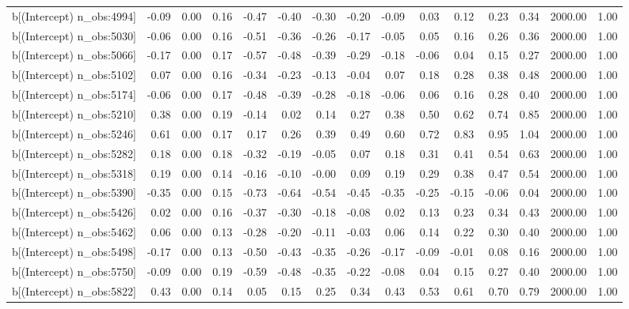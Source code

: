 \begin{table}[ht]
\begin{tabular}{rrrrrrrrrrrrrrr}
  b[(Intercept) n\_obs:4994] & -0.09 & 0.00 & 0.16 & -0.47 & -0.40 & -0.30 & -0.20 & -0.09 & 0.03 & 0.12 & 0.23 & 0.34 & 2000.00 & 1.00 \\ 
  b[(Intercept) n\_obs:5030] & -0.06 & 0.00 & 0.16 & -0.51 & -0.36 & -0.26 & -0.17 & -0.05 & 0.05 & 0.16 & 0.26 & 0.36 & 2000.00 & 1.00 \\ 
  b[(Intercept) n\_obs:5066] & -0.17 & 0.00 & 0.17 & -0.57 & -0.48 & -0.39 & -0.29 & -0.18 & -0.06 & 0.04 & 0.15 & 0.27 & 2000.00 & 1.00 \\ 
  b[(Intercept) n\_obs:5102] & 0.07 & 0.00 & 0.16 & -0.34 & -0.23 & -0.13 & -0.04 & 0.07 & 0.18 & 0.28 & 0.38 & 0.48 & 2000.00 & 1.00 \\ 
  b[(Intercept) n\_obs:5174] & -0.06 & 0.00 & 0.17 & -0.48 & -0.39 & -0.28 & -0.18 & -0.06 & 0.06 & 0.16 & 0.28 & 0.40 & 2000.00 & 1.00 \\ 
  b[(Intercept) n\_obs:5210] & 0.38 & 0.00 & 0.19 & -0.14 & 0.02 & 0.14 & 0.27 & 0.38 & 0.50 & 0.62 & 0.74 & 0.85 & 2000.00 & 1.00 \\ 
  b[(Intercept) n\_obs:5246] & 0.61 & 0.00 & 0.17 & 0.17 & 0.26 & 0.39 & 0.49 & 0.60 & 0.72 & 0.83 & 0.95 & 1.04 & 2000.00 & 1.00 \\ 
  b[(Intercept) n\_obs:5282] & 0.18 & 0.00 & 0.18 & -0.32 & -0.19 & -0.05 & 0.07 & 0.18 & 0.31 & 0.41 & 0.54 & 0.63 & 2000.00 & 1.00 \\ 
  b[(Intercept) n\_obs:5318] & 0.19 & 0.00 & 0.14 & -0.16 & -0.10 & -0.00 & 0.09 & 0.19 & 0.29 & 0.38 & 0.47 & 0.54 & 2000.00 & 1.00 \\ 
  b[(Intercept) n\_obs:5390] & -0.35 & 0.00 & 0.15 & -0.73 & -0.64 & -0.54 & -0.45 & -0.35 & -0.25 & -0.15 & -0.06 & 0.04 & 2000.00 & 1.00 \\ 
  b[(Intercept) n\_obs:5426] & 0.02 & 0.00 & 0.16 & -0.37 & -0.30 & -0.18 & -0.08 & 0.02 & 0.13 & 0.23 & 0.34 & 0.43 & 2000.00 & 1.00 \\ 
  b[(Intercept) n\_obs:5462] & 0.06 & 0.00 & 0.13 & -0.28 & -0.20 & -0.11 & -0.03 & 0.06 & 0.14 & 0.22 & 0.30 & 0.40 & 2000.00 & 1.00 \\ 
  b[(Intercept) n\_obs:5498] & -0.17 & 0.00 & 0.13 & -0.50 & -0.43 & -0.35 & -0.26 & -0.17 & -0.09 & -0.01 & 0.08 & 0.16 & 2000.00 & 1.00 \\ 
  b[(Intercept) n\_obs:5750] & -0.09 & 0.00 & 0.19 & -0.59 & -0.48 & -0.35 & -0.22 & -0.08 & 0.04 & 0.15 & 0.27 & 0.40 & 2000.00 & 1.00 \\ 
  b[(Intercept) n\_obs:5822] & 0.43 & 0.00 & 0.14 & 0.05 & 0.15 & 0.25 & 0.34 & 0.43 & 0.53 & 0.61 & 0.70 & 0.79 & 2000.00 & 1.00 \\ 

\end{tabular}
\end{table}
